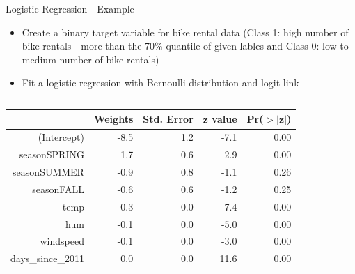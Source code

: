\documentclass[11pt,compress,t,notes=noshow, aspectratio=169, xcolor=table]{beamer}
\begin{document}
\begin{frame}{Logistic Regression - Example}

\begin{itemize}
    \item Create a binary target variable for bike rental data (Class 1: high number of bike rentals - more than the 70\% quantile of given lables and Class 0: low to medium number of bike rentals)
    \item Fit a logistic regression with Bernoulli distribution and logit link
\end{itemize}

\begin{columns}[T]
\begin{column}{0.45\textwidth}
\begin{table}[ht]
\centering
\tiny
\begin{tabular}{rrrrr}
  \hline
 & Weights & Std. Error & z value & Pr($>$$|$z$|$) \\ 
  \hline
(Intercept) & -8.5 & 1.2 & -7.1 & 0.00 \\ 
  seasonSPRING & 1.7 & 0.6 & 2.9 & 0.00 \\ 
  seasonSUMMER & -0.9 & 0.8 & -1.1 & 0.26 \\ 
  seasonFALL & -0.6 & 0.6 & -1.2 & 0.25 \\ 
  temp & 0.3 & 0.0 & 7.4 & 0.00 \\ 
  hum & -0.1 & 0.0 & -5.0 & 0.00 \\ 
  windspeed & -0.1 & 0.0 & -3.0 & 0.00 \\ 
  days\_since\_2011 & 0.0 & 0.0 & 11.6 & 0.00 \\ 
   \hline
\end{tabular}
\end{table}


\end{column}
\end{columns}
\end{frame}
\end{document}
